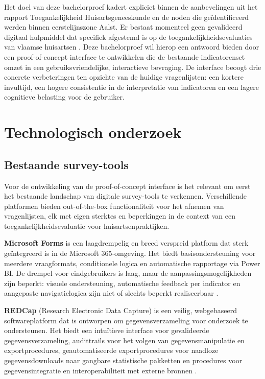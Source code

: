 Het doel van deze bachelorproef kadert expliciet binnen de aanbevelingen uit het rapport Toegankelijkheid Huisartsgeneeskunde \autocite{Merckx2023} en de noden die geïdentificeerd werden binnen eerstelijnszone Aalst.
Er bestaat momenteel geen gevalideerd digitaal hulpmiddel dat specifiek afgestemd is op de toegankelijkheidsevaluaties van vlaamse huisartsen \autocite{Merckx2023}.
Deze bachelorproef wil hierop een antwoord bieden door een proof-of-concept interface te ontwikkelen die de bestaande indicatorenset omzet in een gebruiksvriendelijke, interactieve bevraging.
De interface beoogt drie concrete verbeteringen ten opzichte van de huidige vragenlijsten: een kortere invultijd, een hogere consistentie in de interpretatie van indicatoren en een lagere cognitieve belasting voor de gebruiker.

\section{Technologisch onderzoek}
\label{sec:technologisch-onderzoek}

\subsection{Bestaande survey-tools}
\label{subsec:survey-tools}

Voor de ontwikkeling van de proof-of-concept interface is het relevant om eerst het bestaande
landschap van digitale survey-tools te verkennen. Verschillende platformen bieden
out-of-the-box functionaliteit voor het afnemen van vragenlijsten, elk met eigen sterktes en
beperkingen in de context van een toegankelijkheidsevaluatie voor huisartsenpraktijken.
\medskip

\textbf{Microsoft Forms} is een laagdrempelig en breed verspreid platform dat sterk geïntegreerd
is in de Microsoft 365-omgeving. Het biedt basisondersteuning voor meerdere vraagformats, conditionele logica en automatische
rapportage via Power BI. De drempel voor eindgebruikers is laag, maar de aanpassingsmogelijkheden zijn beperkt: visuele ondersteuning, automatische feedback per indicator en
aangepaste navigatielogica zijn niet of slechts beperkt realiseerbaar \autocite{microsoftForms}.
\medskip

\textbf{REDCap} (Research Electronic Data Capture) is een veilig, webgebaseerd softwareplatform dat is ontworpen om gegevensverzameling voor onderzoek te ondersteunen.
Het biedt een intuïtieve interface voor gevalideerde gegevensverzameling, 
audittrails voor het volgen van gegevensmanipulatie en exportprocedures, 
geautomatiseerde exportprocedures voor naadloze gegevensdownloads naar gangbare statistische pakketten en procedures voor gegevensintegratie en interoperabiliteit met externe bronnen \autocite{Harris2009}.
\medskip

